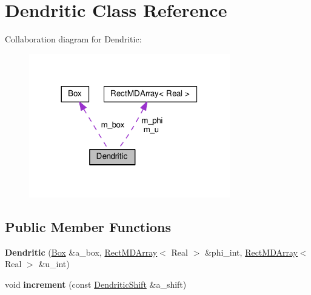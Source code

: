 \hypertarget{classDendritic}{}\section{Dendritic Class Reference}
\label{classDendritic}


Collaboration diagram for Dendritic\+:
\nopagebreak
\begin{figure}[H]
\begin{center}
\leavevmode
\includegraphics[width=248pt]{classDendritic__coll__graph}
\end{center}
\end{figure}
\subsection*{Public Member Functions}
\begin{DoxyCompactItemize}
\item 
\hypertarget{classDendritic_afefc8047c94056afaa56617c24518a1e}{}{\bfseries Dendritic} (\hyperlink{classBox}{Box} \&a\+\_\+box, \hyperlink{classRectMDArray}{Rect\+M\+D\+Array}$<$ Real $>$ \&phi\+\_\+int, \hyperlink{classRectMDArray}{Rect\+M\+D\+Array}$<$ Real $>$ \&u\+\_\+int)\label{classDendritic_afefc8047c94056afaa56617c24518a1e}

\item 
\hypertarget{classDendritic_a152a728fd7bac656f0d322d0e844dec8}{}void {\bfseries increment} (const \hyperlink{classDendriticShift}{Dendritic\+Shift} \&a\+\_\+shift)\label{classDendritic_a152a728fd7bac656f0d322d0e844dec8}

\end{DoxyCompactItemize}
